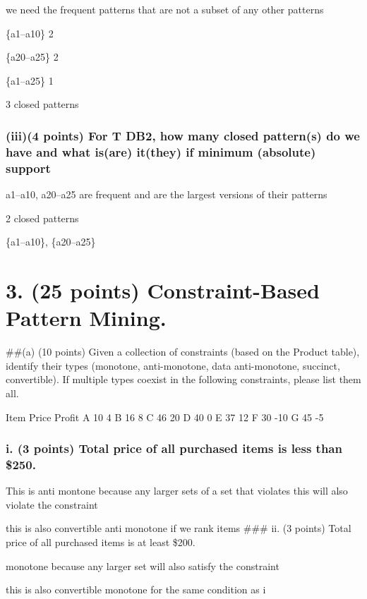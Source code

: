 \documentclass[
]{article}
\begin{document}
we need the frequent patterns that are not a subset of any other
patterns

\{a1--a10\} 2

\{a20--a25\} 2

\{a1--a25\} 1

3 closed patterns

\subsubsection{(iii)(4 points) For T DB2, how many closed pattern(s) do
we have and what is(are) it(they) if minimum (absolute)
support}\label{iii4-points-for-t-db2-how-many-closed-patterns-do-we-have-and-what-isare-itthey-if-minimum-absolute-support}

a1--a10, a20--a25 are frequent and are the largest versions of their
patterns

2 closed patterns

\{a1--a10\}, \{a20--a25\}

\section{3. (25 points) Constraint-Based Pattern
Mining.}\label{points-constraint-based-pattern-mining.}

\#\#(a) (10 points) Given a collection of constraints (based on the
Product table), identify their types (monotone, anti-monotone, data
anti-monotone, succinct, convertible). If multiple types coexist in the
following constraints, please list them all.

Item Price Profit A 10 4 B 16 8 C 46 20 D 40 0 E 37 12 F 30 -10 G 45 -5

\subsubsection{i. (3 points) Total price of all purchased items is less
than
\$250.}\label{i.-3-points-total-price-of-all-purchased-items-is-less-than-250.}

This is anti montone because any larger sets of a set that violates this
will also violate the constraint

this is also convertible anti monotone if we rank items \#\#\# ii. (3
points) Total price of all purchased items is at least \$200.

monotone because any larger set will also satisfy the constraint

this is also convertible monotone for the same condition as i
\end{document}
